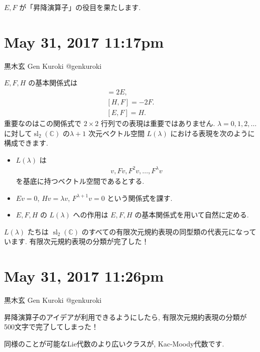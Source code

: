 \documentclass[12pt,twoside]{jarticle}
\theoremstyle{jplain}
\theoremstyle{jplain}
\theoremstyle{jplain}
\numberwithin{theorem}{section}
\numberwithin{equation}{section}
\numberwithin{figure}{section}
\numberwithin{table}{section}
\begin{document}
$E,F$ が「昇降演算子」の役目を果たします. 







\section{ May 31, 2017 11:17pm}








黒木玄 Gen Kuroki
@genkuroki


$E,F,H$ の基本関係式は\begin{align*}[H,E]=2E,\\ [H,F]=-2F.\\ [E,F]=H.\end{align*}重要なのはこの関係式で $2\times 2$ 行列での表現は重要ではありません. $\lambda=0,1,2,\ldots$ に対して$\operatorname{sl}_2(\mathbb C)$ の$\lambda+1$ 次元ベクトル空間 $L(\lambda)$ における表現を次のように構成できます.
\begin{itemize} 
\item $L(\lambda)$ は\begin{align*}v,Fv,F^2v,\ldots,F^\lambda v\end{align*}を基底に持つベクトル空間であるとする. 
\item $Ev=0$, $Hv=\lambda v$, $F^{\lambda+1}v=0$ という関係式を課す. 
\item $E,F,H$ の $L(\lambda)$ への作用は $E,F,H$ の基本関係式を用いて自然に定める. 
\end{itemize}
$L(\lambda)$ たちは  $\operatorname{sl}_2(\mathbb C)$ のすべての有限次元規約表現の同型類の代表元になっています. 有限次元規約表現の分類が完了した！







\section{ May 31, 2017 11:26pm}








黒木玄 Gen Kuroki
@genkuroki


昇降演算子のアイデアが利用できるようにしたら, 有限次元規約表現の分類が500文字で完了してしまった！

同様のことが可能なLie代数のより広いクラスが, Kac-Moody代数です. 
\end{document}
